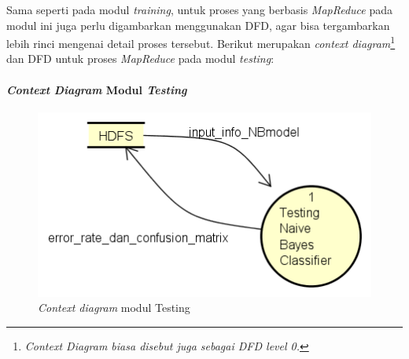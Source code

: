 Sama seperti pada modul \textit{training}, untuk proses yang berbasis \textit{MapReduce} pada modul ini juga perlu digambarkan menggunakan DFD, agar bisa tergambarkan lebih rinci mengenai detail proses tersebut. Berikut merupakan \textit{context diagram}\footnote{\textit{Context Diagram biasa disebut juga sebagai DFD level 0.}} dan DFD untuk proses \textit{MapReduce} pada modul \textit{testing}:

\paragraph{\textit{Context Diagram} Modul \textit{Testing}}
\begin{figure}[H]
	\centering
	\includegraphics[scale=0.65]{Diagram/DFD_0_Testing}
	\caption[\textit{Context diagram} modul Testing]{\textit{Context diagram} modul Testing}
	\label{fig:Context diagram modul Testing}
\end{figure}

